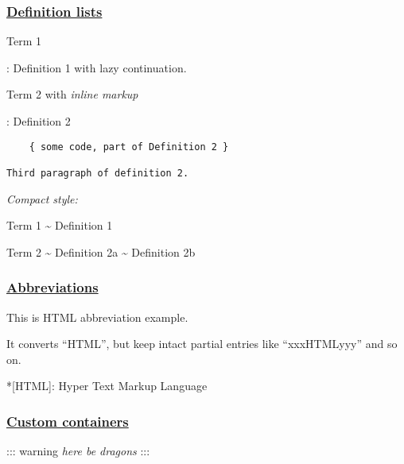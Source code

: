 \documentclass[]{article}
\begin{document}
\subsubsection{\texorpdfstring{\href{https://github.com/markdown-it/markdown-it-deflist}{Definition
lists}}{Definition lists}}

Term 1

: Definition 1 with lazy continuation.

Term 2 with \emph{inline markup}

: Definition 2

\begin{verbatim}
    { some code, part of Definition 2 }

Third paragraph of definition 2.
\end{verbatim}

\emph{Compact style:}

Term 1 \textasciitilde{} Definition 1

Term 2 \textasciitilde{} Definition 2a \textasciitilde{} Definition 2b

\subsubsection{\texorpdfstring{\href{https://github.com/markdown-it/markdown-it-abbr}{Abbreviations}}{Abbreviations}}

This is HTML abbreviation example.

It converts ``HTML'', but keep intact partial entries like
``xxxHTMLyyy'' and so on.

*{[}HTML{]}: Hyper Text Markup Language

\subsubsection{\texorpdfstring{\href{https://github.com/markdown-it/markdown-it-container}{Custom
containers}}{Custom containers}}

::: warning \emph{here be dragons} :::
\end{document}
